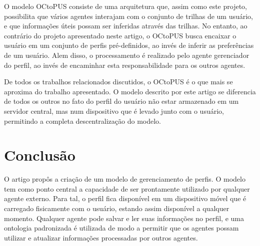 \documentclass[a4paper, twocolumn]{article}
\begin{document}

O modelo OCtoPUS \cite{silva09} consiste de uma arquitetura que, assim como este projeto, possibilita que vários agentes interajam com o conjunto de trilhas de um usuário, e que informações úteis possam ser inferidas através das trilhas. No entanto, ao contrário do projeto apresentado neste artigo, o OCtoPUS busca encaixar o usuário em um conjunto de perfis pré-definidos, ao invés de inferir as preferências de um usuário. Alem disso, o processamento é realizado pelo agente gerenciador do perfil, ao invés de encaminhar esta responsabilidade para os outros agentes.


De todos os trabalhos relacionados discutidos, o OCtoPUS é o que mais se aproxima do trabalho apresentado. O modelo descrito por este artigo se diferencia de todos os outros no fato do perfil do usuário não estar armazenado em um servidor central, mas num dispositivo que é levado junto com o usuário, permitindo a completa descentralização do modelo. 



\section{Conclusão} \label{sec:conclusao}

O artigo propôs a criação de um modelo de gerenciamento de perfis. O modelo tem como ponto central a capacidade de ser prontamente utilizado por qualquer agente externo. Para tal, o perfil fica disponível em um dispositivo móvel que é carregado fisicamente com o usuário, estando assim disponível a qualquer momento. Qualquer agente pode salvar e ler suas informações no perfil, e uma ontologia padronizada é utilizada de modo a permitir que os agentes possam utilizar e atualizar informações processadas por outros agentes.
\end{document}
